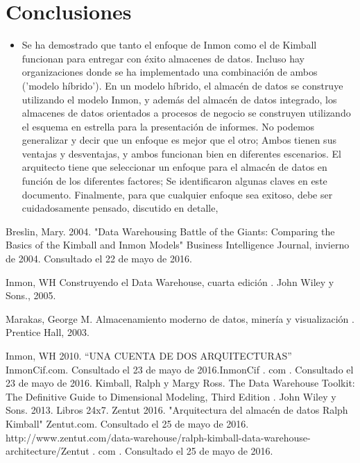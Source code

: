\documentclass[twoside,twocolumn]{article}
\begin{document}
\section{Conclusiones}
\begin{itemize}	
 \item Se ha demostrado que tanto el enfoque de Inmon como el de Kimball funcionan para entregar con éxito almacenes de datos. Incluso hay organizaciones donde se ha implementado una combinación de ambos ('modelo híbrido'). En un modelo híbrido, el almacén de datos se construye utilizando el modelo Inmon, y además del almacén de datos integrado, los almacenes de datos orientados a procesos de negocio se construyen utilizando el esquema en estrella para la presentación de informes. No podemos generalizar y decir que un enfoque es mejor que el otro; Ambos tienen sus ventajas y desventajas, y ambos funcionan bien en diferentes escenarios. El arquitecto tiene que seleccionar un enfoque para el almacén de datos en función de los diferentes factores; Se identificaron algunas claves en este documento. Finalmente, para que cualquier enfoque sea exitoso, debe ser cuidadosamente pensado, discutido en detalle,
\\


\end{itemize} 





\begin{thebibliography}{99} 

\bibitem[1]{}
\newblock Breslin, Mary. 2004. "Data Warehousing Battle of the Giants: Comparing the Basics of the Kimball and Inmon Models" Business Intelligence Journal, invierno de 2004. Consultado el 22 de mayo de 2016.

\bibitem[2]{}
\newblock Inmon, WH  Construyendo el Data Warehouse, cuarta edición . John Wiley y Sons., 2005.

\bibitem[3]{}
\newblock Marakas, George M.  Almacenamiento moderno de datos, minería y visualización . Prentice Hall, 2003.

\bibitem[4]{}
\newblock Inmon, WH 2010. “UNA CUENTA DE DOS ARQUITECTURAS” InmonCif.com. Consultado el 23 de mayo de 2016.InmonCif . com . Consultado el 23 de mayo de 2016.
\bibitem[5]{}
\newblock Kimball, Ralph y Margy Ross. The Data Warehouse Toolkit: The Definitive Guide to Dimensional Modeling, Third Edition . John Wiley y Sons. 2013. Libros 24x7.
\bibitem[6]{}
\newblock Zentut 2016. "Arquitectura del almacén de datos Ralph Kimball" Zentut.com. Consultado el 25 de mayo de 2016.  http://www.zentut.com/data-warehouse/ralph-kimball-data-warehouse-architecture/Zentut . com . Consultado el 25 de mayo de 2016. 




\end{thebibliography}


\end{document}
